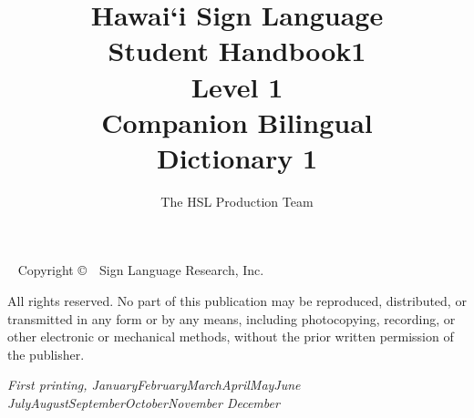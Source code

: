 \documentclass{tufte-book}
\title[HSL Handbook 1]{Hawai`i Sign Language\\ \hspace{-0.5cm}Student Handbook1\\\hspace{-0.5cm}Level 1 \\\hspace{-0.5cm}Companion Bilingual\\ \hspace{-0.5cm}Dictionary 1 }
\author[The HSL Production Team]{The HSL Production Team}
\newcommand{\monthyear}{%
  \ifcase\month\or January\or February\or March\or April\or May\or June\or
  July\or August\or September\or October\or November\or
  December\fi\space\number\year
}
\newcommand{\blankpage}{\newpage\hbox{}\thispagestyle{empty}\newpage}
\begin{document}
\frontmatter





\maketitle



\newpage
\begin{fullwidth}
~\vfill
\thispagestyle{empty}
\setlength{\parindent}{0pt}
\setlength{\parskip}{\baselineskip}
Copyright \copyright\ \the\year\ Sign Language Research, Inc.

\par{}


\par All rights reserved. No part of this publication may be reproduced, distributed, or transmitted in any form or by any means, including photocopying, recording, or other electronic or mechanical methods, without the prior written permission of the publisher.

\par\textit{First printing, \monthyear}
\end{fullwidth}
\end{document}
